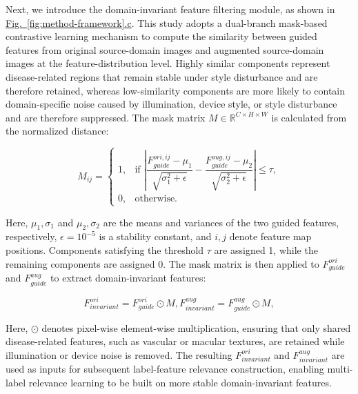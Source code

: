 Next, we introduce the domain-invariant feature filtering module, as shown in \hyperref[fig:method-framework]{Fig.~\ref*{fig:method-framework}.c}. This study adopts a dual-branch mask-based contrastive learning mechanism to compute the similarity between guided features from original source-domain images and augmented source-domain images at the feature-distribution level. Highly similar components represent disease-related regions that remain stable under style disturbance and are therefore retained, whereas low-similarity components are more likely to contain domain-specific noise caused by illumination, device style, or style disturbance and are therefore suppressed. The mask matrix \(M \in \mathbb{R}^{C \times H \times W}\) is calculated from the normalized distance:

\begin{equation}\label{eq:mask}
M_{ij} =
\left\{
\begin{array}{ll}
1, & \text{if } \left| \dfrac{F_{guide}^{ori,ij} - \mu_{1}}{\sqrt{\sigma_{1}^{2} + \epsilon}} - \dfrac{F_{guide}^{aug,ij} - \mu_{2}}{\sqrt{\sigma_{2}^{2} + \epsilon}} \right| \leq \tau, \\
0, & \text{otherwise.}
\end{array}
\right.
\end{equation}

Here, \(\mu_{1},\sigma_{1}\) and \(\mu_{2},\sigma_{2}\) are the means and variances of the two guided features, respectively, \(\epsilon = 10^{-5}\) is a stability constant, and \(i,j\) denote feature map positions. Components satisfying the threshold \(\tau\) are assigned 1, while the remaining components are assigned 0. The mask matrix is then applied to \(F_{guide}^{ori}\) and \(F_{guide}^{aug}\) to extract domain-invariant features:

\begin{equation}\label{eq:invariant-feature}
F_{invariant}^{ori} = F_{guide}^{ori} \odot M,F_{invariant}^{aug} = F_{guide}^{aug} \odot M,
\end{equation}

Here, \(\odot\) denotes pixel-wise element-wise multiplication, ensuring that only shared disease-related features, such as vascular or macular textures, are retained while illumination or device noise is removed. The resulting \(F_{invariant}^{ori}\) and \(F_{invariant}^{aug}\) are used as inputs for subsequent label-feature relevance construction, enabling multi-label relevance learning to be built on more stable domain-invariant features.

